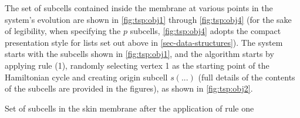 
The set of subcells contained inside the membrane at various points in the system's evolution are shown in \autoref{fig:tsp:obj1} through \autoref{fig:tsp:obj4} (for the sake of legibility, when specifying the \(p\) subcells, \autoref{fig:tsp:obj4} adopts the compact presentation style for lists set out above in \autoref{sec-data-structures}).  The system starts with the subcells shown in \autoref{fig:tsp:obj1}, and the algorithm starts by applying rule (1), randomly selecting vertex 1 as the starting point of the Hamiltonian cycle and creating origin subcell \(s(...)\) (full details of the contents of the subcells are provided in the figures), as shown in \autoref{fig:tsp:obj2}.


\begin{cpobjectsfloat}
\begin{cpobjects}
\end{cpobjects}
\caption{\label{fig:tsp:obj2}Set of subcells in the skin membrane after the application of rule one}
\end{cpobjectsfloat}

